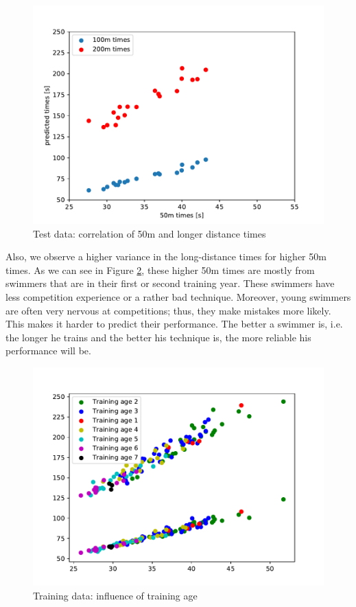 \begin{figure}[ht]
    \centering
    \includegraphics[scale=0.5]{visualisation/test_data.pdf}
    \caption{Test data: correlation of 50m and longer distance times}
    \label{fig:test_data}
\end{figure}
Also, we observe a higher variance in the long-distance times for higher 50m times. As we can see in Figure \ref{fig:training_age}, these higher 50m times are mostly from swimmers that are in their first or second training year. These swimmers have less competition experience or a rather bad technique. Moreover, young swimmers are often very nervous at competitions; thus, they make mistakes more likely. This makes it harder to predict their performance. The better a swimmer is, i.e. the longer he trains and the better his technique is, the more reliable his performance will be.
\begin{figure}[ht]
    \centering
    \includegraphics[scale=0.5]{visualisation/training_data_train_ages.pdf}
    \caption{Training data: influence of training age}
    \label{fig:training_age}
\end{figure}
